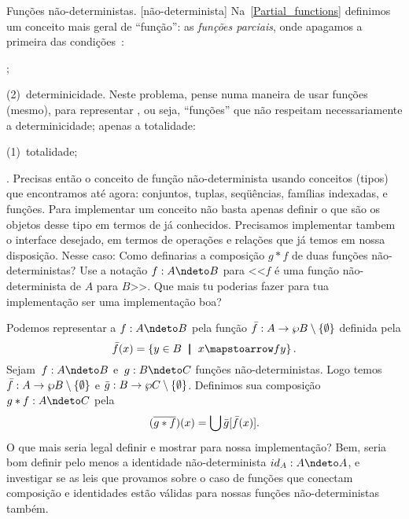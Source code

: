 \endproblem

\problem Funções não-deterministas.
\label{implement_nondeterministic_functions}%
[não-determinista]%
Na~\ref{Partial_functions} definimos um conceito mais geral de ``função'':
as \emph{funções parciais}, onde apagamos a primeira das
condições~:
\beginil
\item{};
\item{}(2)~determinicidade.
\endil
Neste problema, pense numa maneira de usar funções (mesmo), para
representar , ou seja, ``funções''
que não respeitam necessariamente a determinicidade; apenas a totalidade:
\beginil
\item{}(1)~totalidade;
\item{}.
\endil
Precisas então  o conceito de função não-determinista
usando conceitos (tipos) que encontramos até agora: conjuntos, tuplas,
seqüências, famílias indexadas, e funções.
Para implementar um conceito não basta apenas definir o que são os
objetos desse tipo em termos de já conhecidos.
Precisamos implementar tambem o interface desejado, em termos de operações e
relações que já temos em nossa disposição.
Nesse caso:
\endgraf
Como definarias a composição $g \ast f$ de duas funções não-deterministas?
Use a notação $f : A \ndeto B$ para <<$f$ é uma função não-determinista
de $A$ para $B$>>.
Que mais tu poderias fazer para tua implementação ser uma implementação boa?

\solution
Podemos representar a $f : A \ndeto B$ pela função
$\bar f : A \to {\wp}B\setminus\left\{\emptyset\right\}$ definida pela
$$
\bar f(x) = \setst {y\in B} {x\mapstoarrow f y}.
$$
Sejam~$f : A \ndeto B$ e~$g : B \ndeto C$ funções não-deterministas.
Logo temos $\bar f : A \to {\wp}B\setminus\left\{\emptyset\right\}$
e          $\bar g : B \to {\wp}C\setminus\left\{\emptyset\right\}$.
Definimos sua composição
$g\ast f : A \ndeto C$ pela
$$
(\overline{g\ast f})(x) = \bigcup \bar g[\bar f (x)].
$$
O que mais seria legal definir e mostrar para nossa implementação?
Bem, seria bom definir pelo menos a identidade não-determinista
$id_A : A \ndeto A$, e investigar se as leis que provamos sobre
o caso de funções que conectam composição e identidades estão válidas
para nossas funções não-deterministas também.

\endproblem

\endproblems

